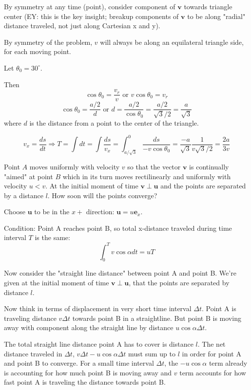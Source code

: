  By symmetry at any time (point), consider component of $\mathbf{v}$ towards triangle center (EY: this is the key insight; breakup components of $\mathbf{v}$ to be along "radial" distance traveled, not just along Cartesian x and y).

By symmetry of the problem, $v$ will always be along an equilateral triangle side, for each moving point.

Let $\theta_0 = 30^{\circ}$.

Then
\[
\cos{\theta_0} = \frac{v_r}{v} \text{ or } v\cos{\theta_0} = v_r
\]
\[
\cos{\theta_0} = \frac{a/2 }{ d} \text{ or } d = \frac{a/2}{ \cos{\theta_0}} = \frac{a/2}{ \sqrt{3}/2 } = \frac{a}{\sqrt{3}}
\]
where $d$ is the distance from a point to the center of the triangle.

\[
v_x = \frac{ds}{dt} \Longrightarrow T = \int dt = \int \frac{ds}{v_x} = \int^0_{a/\sqrt{3}} \frac{ds}{ -v\cos{\theta_0}} = \frac{-a}{\sqrt{3}} \frac{1}{v\sqrt{3}/2} = \frac{2a}{3v}
\]


 Point $A$ moves uniformly with velocity $v$ so that the vector $\mathbf{v}$ is continually "aimed" at point $B$ which in its turn moves rectilinearly and uniformly with velocity $u < v$. At the initial moment of time $\mathbf{v} \perp \mathbf{u}$ and the points are separated by a distance $l$. How soon will the points converge?

 Choose $\mathbf{u}$ to be in the $x+$ direction: $\mathbf{u} = u\mathbf{e}_x$. 

Condition: Point A reaches point B, so total x-distance traveled during time interval $T$ is the same:
\begin{equation}
	\int_0^T v \cos{\alpha} dt = u T
\end{equation}

Now consider the "straight line distance" between point A and point B. We're given at the initial moment of time $\mathbf{v} \perp \mathbf{u}$, that the points are separated by distance $l$.

Now think in terms of displacement in very short time interval $\Delta t$. Point A is traveling distance $v\Delta t$ towards point B in a straightline. But point B is moving away with component along the straight line by distance $u\cos{\alpha} \Delta t$.

The total straight line distance point A has to cover is distance $l$. The net distance traveled in $\Delta t$, $v\Delta t - u\cos{\alpha} \Delta t$ must sum up to $l$ in order for point A and point B to converge. For a small time interval $\Delta t$, the $-u\cos{\alpha}$ term already is accounting for how much point B is moving away and $v$ term accounts for how fast point A is traveling the distance towards point B.

